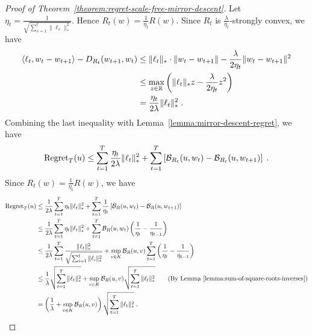\begin{proof}[Proof of Theorem~\ref{theorem:regret-scale-free-mirror-descent}]
Let $\eta_t = \frac{1}{\sqrt{\sum_{s=1}^t \|\ell_s\|_*^2}}$. Hence $R_t(w) = \frac{1}{\eta_t} R(w)$.
Since $R_t$ is $\frac{\lambda}{\eta_t}$-strongly convex, we have
\begin{align*}
\langle \ell_t, w_t - w_{t+1} \rangle - D_{R_t}(w_{t+1}, w_t)
& \le \|\ell_t\|_* \cdot \|w_t - w_{t+1}\| - \frac{\lambda}{2\eta_t} \|w_t - w_{t+1} \|^2 \\
& \le \max_{z \in \mathbb{R}} \left( \|\ell_t\|_* z - \frac{\lambda}{2 \eta_t} z^2 \right) \\
& = \frac{\eta_t}{2\lambda} \|\ell_t\|_*^2 \; .
\end{align*}
Combining the last inequality with Lemma~\ref{lemma:mirror-descent-regret}, we have
$$
\operatorname{Regret}_T(u) \le \sum_{t=1}^T \frac{\eta_t}{2\lambda} \|\ell_t\|_*^2 + \sum_{t=1}^T \left[ \mathcal{B}_{R_t}(u,w_t) - \mathcal{B}_{R_t}(u, w_{t+1}) \right] \; .
$$
Since $R_t(w) = \frac{1}{\eta_t} R(w)$, we have
\begin{align*}
\operatorname{Regret}_T(u)
& \le \frac{1}{2\lambda} \sum_{t=1}^T \eta_t \|\ell_t\|_*^2 + \sum_{t=1}^T \frac{1}{\eta_t} \left[\mathcal{B}_R(u, w_t) - \mathcal{B}_R(u, w_{t+1})\right] \\
& \le \frac{1}{2\lambda} \sum_{t=1}^T \eta_t \|\ell_t\|_*^2 + \sum_{t=1}^T \mathcal{B}_R(u, w_t) \left( \frac{1}{\eta_t} - \frac{1}{\eta_{t-1}} \right) \\
& \le \frac{1}{2\lambda} \sum_{t=1}^T \frac{\|\ell_t\|_*^2}{\sqrt{\sum_{i=1}^t \|\ell_i\|_*^2}} + \sup_{v \in K} \mathcal{B}_R(u,v) \sum_{t=1}^T \left( \frac{1}{\eta_t} - \frac{1}{\eta_{t-1}} \right) \\
& \le \frac{1}{\lambda} \sqrt{\sum_{t=1}^T \|\ell_t\|_*^2} + \sup_{v \in K} \mathcal{B}_R(u,v) \sqrt{\sum_{t=1}^T \|\ell_t\|_*^2} \qquad \text{(By Lemma~\ref{lemma:sum-of-square-roots-inverses})} \\
& = \left( \frac{1}{\lambda} + \sup_{v \in K} \mathcal{B}_R(u,v) \right) \sqrt{\sum_{t=1}^T \|\ell_t\|_*^2} \; .
\end{align*}
\end{proof}

